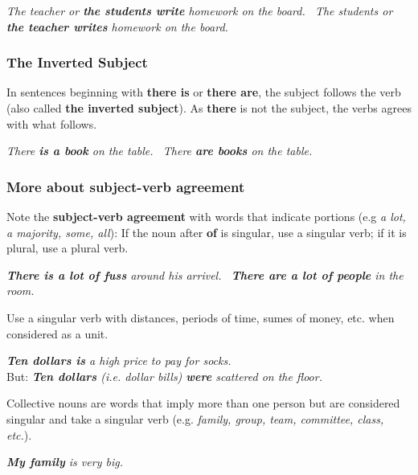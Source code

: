 \documentclass[hidelinks,10pt,a4paper]{article}
\begin{document}
\begin{center}
	\textit{The teacher or \textbf{the students write} homework on the board. \
	The students or \textbf{the teacher writes} homework on the board.}
\end{center}

\subsubsection{The Inverted Subject}

In sentences beginning with \textbf{there is} or \textbf{there are}, the subject follows the verb (also called \textbf{the inverted subject}). As \textbf{there} is not the subject, the verbs agrees with what follows.

\begin{center}
	\textit{There \textbf{is a book} on the table. \
	There \textbf{are books} on the table.}
\end{center}

\subsubsection{More about subject-verb agreement}

Note the \textbf{subject-verb agreement} with words that indicate portions (e.g \textit{a lot, a majority, some, all}): If the noun after \textbf{of} is singular, use a singular verb; if it is plural, use a plural verb.

\begin{center}
	\textit{ \textbf{There is a lot of fuss} around his arrivel. \
	\textbf{There are a lot of people} in the room.}
\end{center}

Use a singular verb with distances, periods of time, sumes of money, etc. when considered as a unit.

\begin{center}
	\textit{ \textbf{Ten dollars is} a high price to pay for socks.} \\
	But: \textit{ \textbf{Ten dollars} (i.e. dollar bills) \textbf{were} scattered on the floor. }
\end{center}

Collective nouns are words that imply more than one person but are considered singular and take a singular verb (e.g. \textit{family, group, team, committee, class, etc.}).
\begin{center}
	\textit{ \textbf{My family} is very big.}
\end{center}
\end{document}
